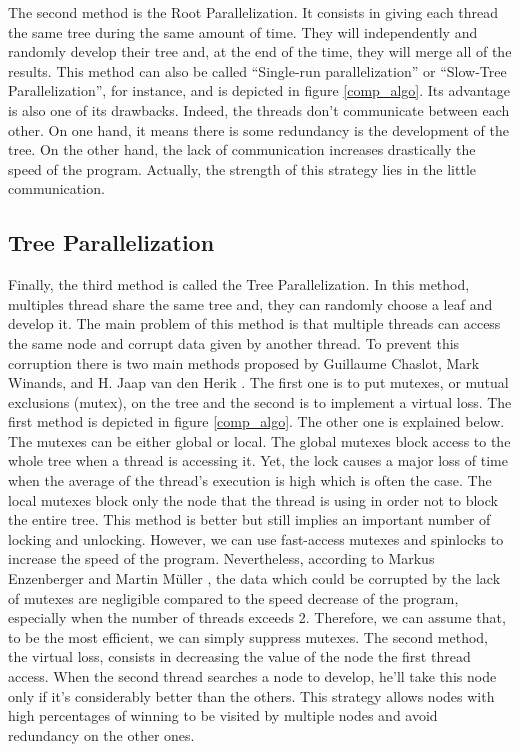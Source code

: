 The second method is the Root Parallelization. It consists in giving each thread the same tree during the same amount of time. They will independently and randomly develop their tree and, at the end of the time, they will merge all of the results. This method can also be called “Single-run parallelization” or “Slow-Tree Parallelization”, for instance, and is depicted in figure \ref{comp_algo}.
\newline
\newline
Its advantage is also one of its drawbacks. Indeed, the threads don’t communicate between each other. On one hand, it means there is some redundancy is the development of the tree. On the other hand, the lack of communication increases drastically the speed of the program. Actually, the strength of this strategy lies in the little communication.

\subsection{Tree Parallelization}

Finally, the third method is called the Tree Parallelization. In this method, multiples thread share the same tree and, they can randomly choose a leaf and develop it. The main problem of this method is that multiple threads can access the same node and corrupt data given by another thread. To prevent this corruption there is two main methods proposed by Guillaume Chaslot, Mark Winands, and H. Jaap van den Herik \cite{parallel_comp}. The first one is to put mutexes, or mutual exclusions (mutex), on the tree and the second is to implement a virtual loss. The first method is depicted in figure \ref{comp_algo}. The other one is explained below.
\newline
\newline
The mutexes can be either global or local. The global mutexes block access to the whole tree when a thread is accessing it. Yet, the lock causes a major loss of time when the average of the thread’s execution is high which is often the case. The local mutexes block only the node that the thread is using in order not to block the entire tree. This method is better but still implies an important number of locking and unlocking. However, we can use fast-access mutexes and spinlocks to increase the speed of the program.
\newline
\newline
Nevertheless, according to Markus Enzenberger and Martin Müller \cite{lock-free}, the data which could be corrupted by the lack of mutexes are negligible compared to the speed decrease of the program, especially when the number of threads exceeds 2. Therefore, we can assume that, to be the most efficient, we can simply suppress mutexes.
\newline
\newline
The second method, the virtual loss, consists in decreasing the value of the node the first thread access. When the second thread searches a node to develop, he’ll take this node only if it’s considerably better than the others. This strategy allows nodes with high percentages of winning to be visited by multiple nodes and avoid redundancy on the other ones.

